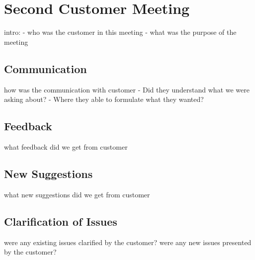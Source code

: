 \section{Second Customer Meeting}
intro:
- who was the customer in this meeting
- what was the purpose of the meeting

\subsection{Communication}
how was the communication with customer
- Did they understand what we were asking about?
- Where they able to formulate what they wanted?

\subsection{Feedback}
what feedback did we get from customer

\subsection{New Suggestions}
what new suggestions did we get from customer

\subsection{Clarification of Issues}
were any existing issues clarified by the customer?
were any new issues presented by the customer?